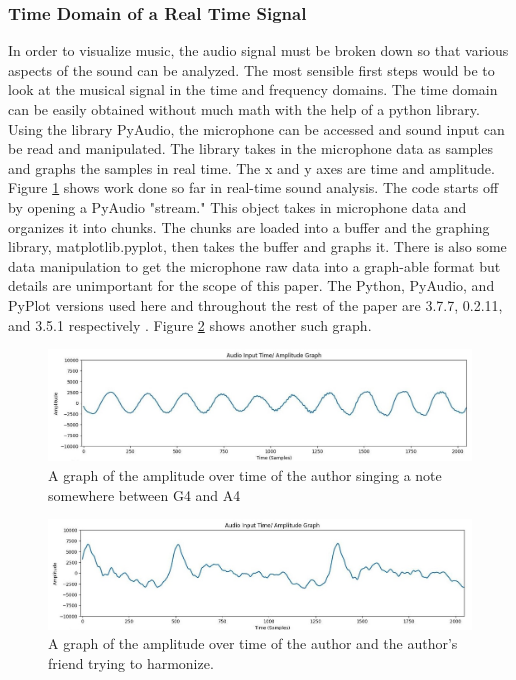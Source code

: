 \documentclass[10pt]{article}
\begin{document}


\subsubsection{Time Domain of a Real Time Signal}
\hspace{\parindent} In order to visualize music, the audio signal must be broken down so that various aspects of the sound can be analyzed. The most sensible first steps would be to look at the musical signal in the time and frequency domains. The time domain can be easily obtained without much math with the help of a python library. Using the library PyAudio, the microphone can be accessed and sound input can be read and manipulated. The library takes in the microphone data as samples and graphs the samples in real time. The x and y axes are time and amplitude. Figure \ref{fig:time_1} shows work done so far in real-time sound analysis. The code starts off by opening a PyAudio "stream." This object takes in microphone data and organizes it into chunks. The chunks are loaded into a buffer and the graphing library, matplotlib.pyplot, then takes the buffer and graphs it. There is also some data manipulation to get the microphone raw data into a graph-able format but details are unimportant for the scope of this paper. The Python, PyAudio, and PyPlot versions used here and throughout the rest of the paper are 3.7.7, 0.2.11, and 3.5.1 respectively \cite{hunter2007pyplot} \cite{pyaudio} \cite{python}. Figure \ref{fig:time_2} shows another such graph.

\begin{figure}[H]
    \centering
    \includegraphics[width=1.05\textwidth]{Alan_1}
    \caption{A graph of the amplitude over time of the author singing a note somewhere between G4 and A4 \cite{noteFrequencies}}
    \label{fig:time_1}
\end{figure}

\begin{figure}[H]
    \centering
    \includegraphics[width=1.05\textwidth]{Matt_1}
    \caption{A graph of the amplitude over time of the author and the author's friend trying to harmonize.}
    \label{fig:time_2}
\end{figure}
\end{document}
